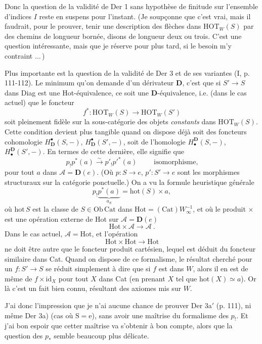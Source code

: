 \documentclass[11pt]{article}
\newcommand{\printedpage}[1]{\marginpar{\footnotesize p.~#1}}
\newcommand{\msp}[1]{\marginpar{\footnotesize [#1]}}
\newcommand{\HOT}{\mathrm{HOT}}
\newcommand{\Cat}{\mathrm{Cat}}
\newcommand{\Ob}{\mathrm{Ob}}
\newcommand{\Hot}{\mathrm{Hot}}
\newcommand{\hot}{\mathrm{hot}}
\begin{document}
Donc la question de la validité de Der 1 sans hypothèse de finitude sur l'ensemble d'indices $I$
\printedpage{81}
\msp{page 132}
reste en suspens pour l'instant. (Je soupçonne que c'est vrai, mais il faudrait, pour le prouver, tenir une description des flèches dans $\HOT_W(S)$ par des chemins de longueur bornée, disons de longueur deux ou trois. C'est une question intéressante, mais que je réserve pour plus tard, si le besoin m'y contraint $\ldots\,$)

Plus importante est la question de la validité de Der 3 et de ses variantes (I, p. 111-112). Le minimum qu'on demande d'un dérivateur $\mathbf{D}$, c'est que si $S'\longrightarrow S$ dans Diag est une Hot-équivalence, ce soit une $\mathbf{D}$-équivalence, i.e. (dans le cas actuel) que le foncteur
\[ f^* : \HOT_W(S) \longrightarrow \HOT_W(S') \]
soit pleinement fidèle sur la sous-catégorie des objets \textit{constants} dans $\HOT_W(S)$. Cette condition devient plus tangible quand on dispose déjà soit des foncteurs cohomologie $H^\bullet_{\mathbf{D}}(S,-)$, $H^\bullet_{\mathbf{D}}(S',-)$, soit de l'homologie $H_\bullet^{\mathbf{D}}(S,-)$, $H_\bullet^{\mathbf{D}}(S',-)$. En termes de cette dernière, elle signifie que
\[ p_!p^*(a) \xrightarrow{\sim} p'_!p'^*(a) \qquad \text{ isomorphisme,} \]
\msp{page 133}
pour tout $a$ dans $\mathcal{A}=\mathbf{D}(e)$. (Où $p:S\longrightarrow e$, $p':S'\longrightarrow e$ sont les morphismes structuraux sur la catégorie ponctuelle.) On a vu la formule heuristique générale
\[ p_!\underbrace{p^*(a)}_{a_S} = \hot(S)\times a, \]
où $\hot\,S$ est la classe de $S\in\Ob\,\Cat$ dans $\Hot=(\Cat)W_\infty^{-1}$, et où le produit $\times$ est une opération externe de Hot sur $\mathcal{A}=\mathbf{D}(e)$
\[ \Hot\times\mathcal{A} \longrightarrow \mathcal{A}\ . \]
Dans le cas actuel, $\mathcal{A}=\Hot$, et l'opération
\[ \Hot\times\Hot \longrightarrow \Hot \]
ne doit être autre que le foncteur produit cartésien, lequel est déduit du foncteur similaire dans Cat. Quand on dispose de ce formalisme, le résultat cherché pour un $f:S'\longrightarrow S$ se réduit simplement à dire que si $f$ est dans $W$, alors il en est de même de $f\times\mathrm{id}_X$ pour tout $X$ dans Cat (en prenant $X$ tel que $\hot(X)\simeq a$). Or là c'est un fait bien connu, résultant des axiomes mis sur $W$.

J'ai donc l'impression que je n'ai aucune chance de prouver Der 3a$'$ (p. 111), ni même Der 3a) (cas où $\mathrm{S}=\mathrm{e}$), sans avoir une maîtrise du formalisme des $p_!$. Et j'ai
\printedpage{82}
\msp{page 134}
bon espoir que cetter maîtrise va s'obtenir à bon compte, alors que la question des $p_*$ semble beaucoup plus délicate. %
\end{document}
